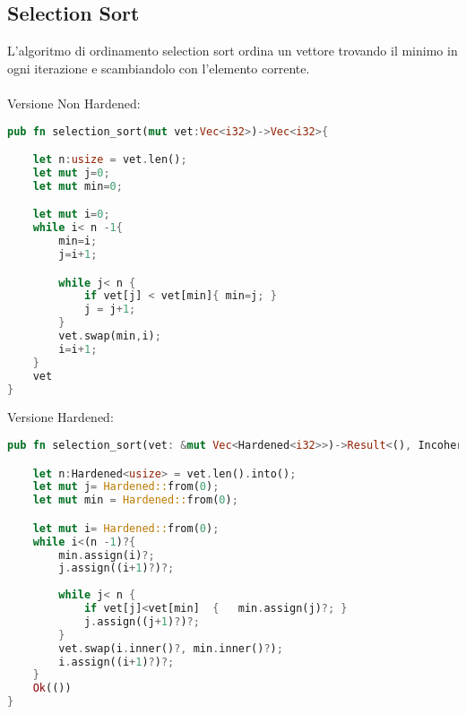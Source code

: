 \subsection{Selection Sort}
L'algoritmo di ordinamento selection sort ordina un vettore trovando il minimo in ogni iterazione e scambiandolo con l'elemento corrente.
\\ \\Versione Non Hardened:
\begin{lstlisting}[language=rust, style=boxed] 
    pub fn selection_sort(mut vet:Vec<i32>)->Vec<i32>{

    let n:usize = vet.len();
    let mut j=0;
    let mut min=0;

    let mut i=0;
    while i< n -1{
        min=i;
        j=i+1;

        while j< n {
            if vet[j] < vet[min]{ min=j; }
            j = j+1;
        }
        vet.swap(min,i);
        i=i+1;
    }
    vet
}
\end{lstlisting}
Versione Hardened:
\begin{lstlisting}[language=rust, style=boxed] 
pub fn selection_sort(vet: &mut Vec<Hardened<i32>>)->Result<(), IncoherenceError>{

    let n:Hardened<usize> = vet.len().into();
    let mut j= Hardened::from(0);
    let mut min = Hardened::from(0);

    let mut i= Hardened::from(0);
    while i<(n -1)?{
        min.assign(i)?;                 
        j.assign((i+1)?)?;        
      
        while j< n {
            if vet[j]<vet[min]  {   min.assign(j)?; }
            j.assign((j+1)?)?;
        }
        vet.swap(i.inner()?, min.inner()?);
        i.assign((i+1)?)?;
    }
    Ok(())
}
\end{lstlisting}

